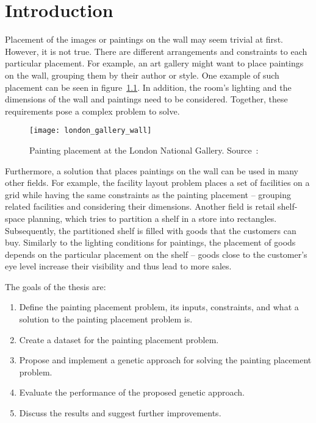 \chapter{Introduction}\label{ch:introduction}

Placement of the images or paintings on the wall may seem trivial at first.
However, it is not true.
There are different arrangements and constraints to each particular placement.
For example, an art gallery might want to place paintings on the wall, grouping them by their author or style.
One example of such placement can be seen in figure~\ref{fig:london-wall}.
In addition, the room's lighting and the dimensions of the wall and paintings need to be considered.
Together, these requirements pose a complex problem to solve.

\begin{figure}[]
    \texttt{[image: london\_gallery\_wall]}
    \caption[Painting placement at the London National Gallery]{Painting placement at the London National Gallery. Source~\cite{ScreenshotWallGoogle}:}
    \label{fig:london-wall}
\end{figure}


Furthermore, a solution that places paintings on the wall can be used in many other fields.
For example, the facility layout problem places a set of facilities on a grid
while having the same constraints as the painting placement – grouping related facilities and considering their dimensions.
Another field is retail shelf-space planning, which tries to partition a shelf in a store into rectangles.
Subsequently, the partitioned shelf is filled with goods that the customers can buy.
Similarly to the lighting conditions for paintings, the placement of goods depends on the
particular placement on the shelf – goods close to the customer's eye level increase their visibility and thus lead to more sales.

The goals of the thesis are:

\begin{enumerate}
    \item Define the painting placement problem, its inputs, constraints, and what a solution to the painting placement problem is.
    \item Create a dataset for the painting placement problem.
    \item Propose and implement a genetic approach for solving the painting placement problem.
    \item Evaluate the performance of the proposed genetic approach.
    \item Discuss the results and suggest further improvements.
\end{enumerate}

